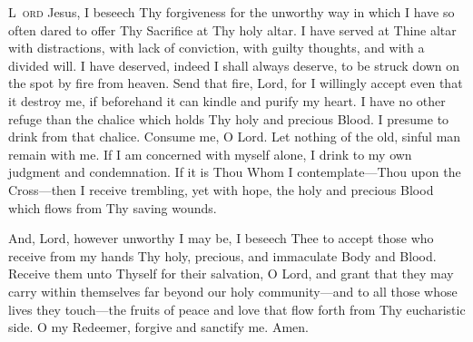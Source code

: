 \documentclass[%
letter]{memoir}
\begin{document}
\begin{tcolorbox}[Baystyle,colback=white]
  {
    \vspace*{5mm}
    \begin{center}
    \end{center}

    \renewcommand{\baselinestretch}{1.04}
    \setlength{\parindent}{1em}


    \begin{framed}
      {\fontsize{14}{14}\selectfont


          \lettrine{L}{\thinspace\ ord} Jesus, I beseech Thy forgiveness for the unworthy way in which I have so often dared to offer Thy Sacrifice at Thy holy altar. I have served at Thine altar with distractions, with lack of conviction, with guilty thoughts, and with a divided will. I have deserved, indeed I shall always deserve, to be struck down on the spot by fire from heaven. Send that fire, Lord, for I willingly accept even that it destroy me, if beforehand it can kindle and purify my heart. I have no other refuge than the chalice which holds Thy holy and precious Blood. I presume to drink from that chalice. Consume me, O Lord. Let nothing of the old, sinful man remain with me. If I am concerned with myself alone, I drink to my own judgment and condemnation. If it is Thou Whom I contemplate---Thou upon the Cross---then I receive trembling, yet with hope, the holy and precious Blood which flows from Thy saving wounds.

          And, Lord, however unworthy I may be, I beseech Thee to accept those who receive from my hands Thy holy, precious, and immaculate Body and Blood. Receive them unto Thyself for their salvation, O Lord, and grant that they may carry within themselves far beyond our holy community---and to all those whose lives they touch---the fruits of peace and love that flow forth from Thy eucharistic side. O my Redeemer, forgive and sanctify me. Amen.

}
\end{framed}}
\end{tcolorbox}
\end{document}
